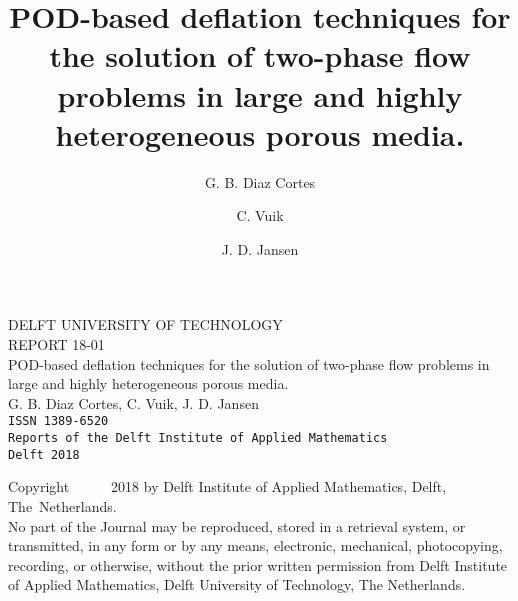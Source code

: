 \documentclass[12pt]{article}
\title{POD-based deflation techniques for the solution of two-phase flow problems in large and highly heterogeneous porous media.}
\author[1]{G. B. Diaz Cortes}
\author[1]{C. Vuik}
\author[2]{J. D. Jansen}
\affil[1]{Department of Applied Mathematics, TU Delft}
\affil[2]{Department of Geoscience \& Engineering, TU Delft}
\date{}
\begin{document}
\thispagestyle{empty}
\noindent
\begin{center}
{\Large \sc DELFT UNIVERSITY OF TECHNOLOGY}
\\
\vspace{3cm}
{\large \sc REPORT 18-01}\\[4ex]
{\large \sc POD-based deflation techniques for the solution of two-phase flow problems in large and highly heterogeneous porous media.}\\[4ex]
{\large \sc G. B. Diaz Cortes, C. Vuik, J. D. Jansen}\\
\vfill
{\tt ISSN 1389-6520}\\[2ex]
{\tt Reports of the Delft Institute of Applied Mathematics}\\[2ex]
{\tt Delft 2018}
\end{center}
\pagebreak
\thispagestyle{empty}
\vspace*{\fill}
\noindent
\hspace*{-0,3cm}Copyright~~~~~~2018 by Delft Institute of Applied Mathematics, Delft, \mbox{The Netherlands.}
\\[2ex]
No part of the Journal may be reproduced, stored in a retrieval system, or
transmitted, in any form or by any means, electronic, mechanical, photocopying,
recording, or otherwise, without the prior written permission from Delft Institute of
Applied Mathematics, Delft University of Technology, The
Netherlands. 
\setcounter{page}{1}
\newpage
\maketitle
\end{document}
